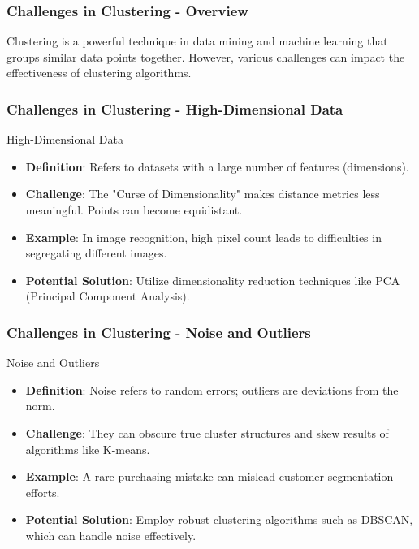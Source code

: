 \documentclass[aspectratio=169]{beamer}
\begin{document}
\begin{frame}[fragile]
    \frametitle{Challenges in Clustering - Overview}
    Clustering is a powerful technique in data mining and machine learning that groups similar data points together. However, various challenges can impact the effectiveness of clustering algorithms.
\end{frame}

\begin{frame}[fragile]
    \frametitle{Challenges in Clustering - High-Dimensional Data}
    \begin{block}{High-Dimensional Data}
        \begin{itemize}
            \item \textbf{Definition}: Refers to datasets with a large number of features (dimensions).
            \item \textbf{Challenge}: The "Curse of Dimensionality" makes distance metrics less meaningful. Points can become equidistant.
            \item \textbf{Example}: In image recognition, high pixel count leads to difficulties in segregating different images.
            \item \textbf{Potential Solution}: Utilize dimensionality reduction techniques like PCA (Principal Component Analysis).
        \end{itemize}
    \end{block}
\end{frame}

\begin{frame}[fragile]
    \frametitle{Challenges in Clustering - Noise and Outliers}
    \begin{block}{Noise and Outliers}
        \begin{itemize}
            \item \textbf{Definition}: Noise refers to random errors; outliers are deviations from the norm.
            \item \textbf{Challenge}: They can obscure true cluster structures and skew results of algorithms like K-means.
            \item \textbf{Example}: A rare purchasing mistake can mislead customer segmentation efforts.
            \item \textbf{Potential Solution}: Employ robust clustering algorithms such as DBSCAN, which can handle noise effectively.
        \end{itemize}
    \end{block}
\end{frame}
\end{document}
